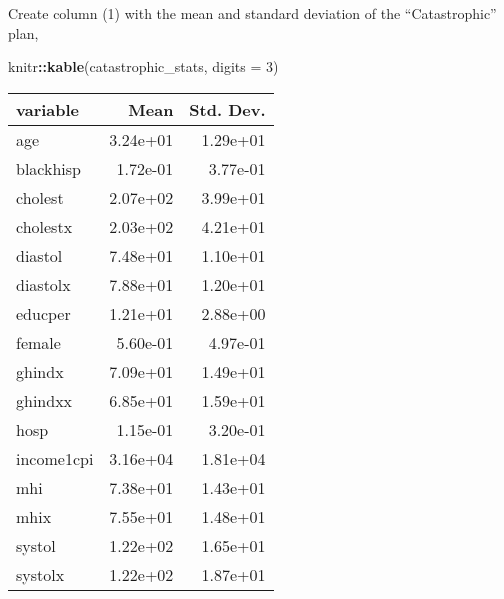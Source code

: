\documentclass[]{book}
\newenvironment{Shaded}{\begin{snugshade}}{\end{snugshade}}
\newcommand{\KeywordTok}[1]{\textcolor[rgb]{0.13,0.29,0.53}{\textbf{#1}}}
\newcommand{\DataTypeTok}[1]{\textcolor[rgb]{0.13,0.29,0.53}{#1}}
\newcommand{\DecValTok}[1]{\textcolor[rgb]{0.00,0.00,0.81}{#1}}
\newcommand{\StringTok}[1]{\textcolor[rgb]{0.31,0.60,0.02}{#1}}
\newcommand{\OtherTok}[1]{\textcolor[rgb]{0.56,0.35,0.01}{#1}}
\newcommand{\OperatorTok}[1]{\textcolor[rgb]{0.81,0.36,0.00}{\textbf{#1}}}
\newcommand{\NormalTok}[1]{#1}
\theoremstyle{definition}
\theoremstyle{definition}
\theoremstyle{definition}
\theoremstyle{remark}
\begin{document}
Create column (1) with the mean and standard deviation of the
``Catastrophic'' plan,

\begin{Shaded}
\end{Shaded}

\begin{Shaded}
\begin{Highlighting}[]
\NormalTok{knitr}\OperatorTok{::}\KeywordTok{kable}\NormalTok{(catastrophic_stats, }\DataTypeTok{digits =} \DecValTok{3}\NormalTok{)}
\end{Highlighting}
\end{Shaded}

\begin{tabular}{l|r|r}
\hline
variable & Mean & Std. Dev.\\
\hline
age & 3.24e+01 & 1.29e+01\\
\hline
blackhisp & 1.72e-01 & 3.77e-01\\
\hline
cholest & 2.07e+02 & 3.99e+01\\
\hline
cholestx & 2.03e+02 & 4.21e+01\\
\hline
diastol & 7.48e+01 & 1.10e+01\\
\hline
diastolx & 7.88e+01 & 1.20e+01\\
\hline
educper & 1.21e+01 & 2.88e+00\\
\hline
female & 5.60e-01 & 4.97e-01\\
\hline
ghindx & 7.09e+01 & 1.49e+01\\
\hline
ghindxx & 6.85e+01 & 1.59e+01\\
\hline
hosp & 1.15e-01 & 3.20e-01\\
\hline
income1cpi & 3.16e+04 & 1.81e+04\\
\hline
mhi & 7.38e+01 & 1.43e+01\\
\hline
mhix & 7.55e+01 & 1.48e+01\\
\hline
systol & 1.22e+02 & 1.65e+01\\
\hline
systolx & 1.22e+02 & 1.87e+01\\
\hline
\end{tabular}
\end{document}
